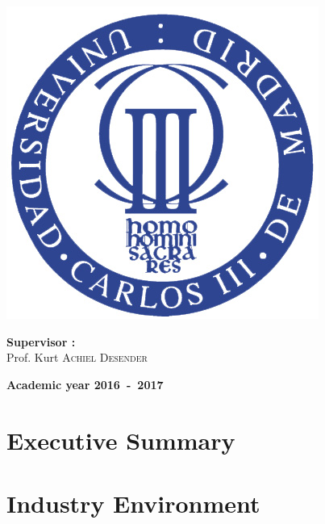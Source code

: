 \documentclass[12pt,a4paper,oneside]{book}
\begin{document}
\begin{titlepage}
\begin{center}
\includegraphics[keepaspectratio=true,width=\textwidth-2cm]{images/Seal_of_the_University_of_Carlos_III.jpg}
\vfill{}
\begin{flushleft}{\large \textbf{Supervisor  :}}\\
{\large Prof. Kurt \textsc{Achiel Desender}}
\end{flushleft}{\large\par}
\vfill{}\vfill{}\enlargethispage{2cm}
\textbf{Academic year 2016~-~2017}
\end{center}
\end{titlepage}



\newpage
\thispagestyle{empty} 
\null

\frontmatter

\tableofcontents

\mainmatter

\chapter{Executive Summary}

\chapter{Industry Environment}
\end{document}
